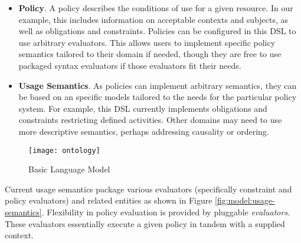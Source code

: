 \begin{itemize}
\begin{itemize}
\end{itemize}
\item \textbf{Policy}.  A policy describes the conditions of use for a given resource.  In our example, this includes information on acceptable contexts and subjects, as well as obligations and constraints.  Policies can be configured in this DSL to use arbitrary evaluators.  This allows users to implement specific policy semantics tailored to their domain if needed, though they are free to use packaged syntax evaluators if those evaluators fit their needs. 
\item \textbf{Usage Semantics}.  As policies can implement arbitrary semantics, they can be based on an specific models tailored to the needs for the particular policy system.  For example, this DSL currently implements obligations and constraints restricting defined activities.  Other domains may need to use more descriptive semantics, perhaps addressing causality or ordering.
\end{itemize}

\begin{figure}[!t]
\centering
\texttt{[image: ontology]}
\caption{Basic Language Model}
\label{fig:model:ontology}
\end{figure}

Current usage semantics package various evaluators (specifically constraint and policy evaluators) and related entities as shown in Figure \ref{fig:model:usage-semantics}. Flexibility in policy evaluation is provided by pluggable \emph{evaluators}.  These evaluators essentially execute a given policy in tandem with a supplied context.

